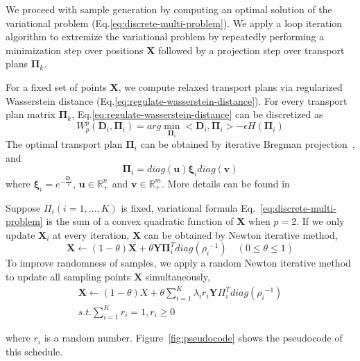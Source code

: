  We proceed with sample generation by computing an optimal solution of the variational problem (Eq.\ref{eq:discrete-multi-problem}).
 We apply a loop iteration algorithm to extremize the variational problem by repeatedly performing a minimization step over positions $\mathbf{X}$ followed by a projection step over transport plans $\mathbf{\Pi}_k$.

 For a fixed set of points $\mathbf X$,
 we compute  relaxed transport plans via regularized Wasserstein distance (Eq.\ref{eq:regulate-wasserstein-distance}).
 For every transport plan matrix $\mathbf{\Pi}_k$,
 Eq.\ref{eq:regulate-wasserstein-distance} can be discretized as
 \begin{equation}\label{eq:discrete-regulate-wasserstein-barycenter}
   W_p^p(\mathbf{D}_i,\mathbf{\Pi}_i)=arg\min\limits_{\mathbf{\Pi}_i}<\mathbf{D}_i,\mathbf{\Pi}_i>-\epsilon H(\mathbf{\Pi}_i)
 \end{equation}
The optimal transport plan $\mathbf{\Pi}_i$ can be obtained by iterative Bregman projection~\cite{cuturi:2013:sinkhorn,benamou:2015:iterative}, and
\begin{equation}\label{eq:transport-plan}
  \mathbf{\Pi}_i=diag(\mathbf{u})\mathbf{\xi}_idiag(\mathbf{v})
\end{equation}
where $\mathbf{\xi}_i=e^{-\frac{\mathbf{D}_i}{\epsilon}}$,
$\mathbf{u}\in \mathbb{R}_+^{n}$ and $\mathbf{v}\in\mathbb{R}_+^{m}$.
More details can be found in~\cite{cuturi:2013:sinkhorn,cuturi:2013:fast,benamou:2015:iterative}



Suppose $\Pi_i(i=1,...,K)$ is fixed,
variational formula Eq.~\ref{eq:discrete-multi-problem}
is the sum of a convex quadratic function of $\mathbf{X}$ when $p=2$.
If we only update $\mathbf{X}_i$ at every iteration,
$\mathbf{X}$ can be obtained by Newton iterative method,
\begin{equation}\label{eq:position-iterative}
  \mathbf{X}\leftarrow(1-\theta)\mathbf{X}+\theta\mathbf{Y}\mathbf{\Pi}_i^T diag({\rho_i}^{-1}) \quad (0\leq\theta\leq 1)
\end{equation}
To improve randomness of samples,
we apply a random Newton iterative method to update all sampling points $\mathbf{X}$ simultaneously,
\begin{equation}
\begin{split}
\mathbf{X}\leftarrow(1-\theta)X+\theta\sum_{i=1}^K\lambda_ir_i\mathbf{Y}\Pi_i^Tdiag({\rho_i}^{-1})\\
 s.t. \sum\limits_{i=1}^{K}r_i=1, r_i\geq 0
 \end{split}
\end{equation}

where $r_i$ is a random number.
Figure~\ref{fig:pseudocode}
shows the pseudocode of this schedule.

